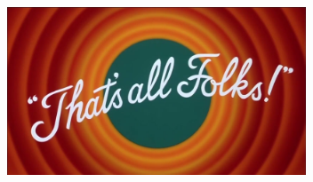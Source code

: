 \documentclass[10pt]{beamer}
\begin{document}
\begin{frame}{\,}
	\begin{center}
		\includegraphics[height=5cm]{images/thats-all-folks.jpg}
	\end{center}
\end{frame}
\end{document}
